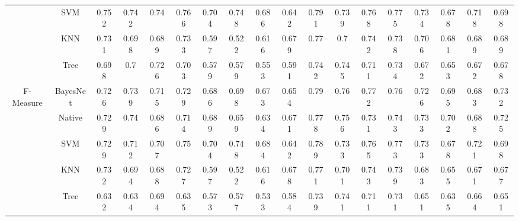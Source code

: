 {\begin{table*}[ht]
\begin{tabular}{|c|c|c|c|c|c|c|c|c|c|c|c|c|c|c|c|c|c|}
&SVM&	0.752&	0.742&	0.74&	0.766&		0.704&	0.748&	0.686&	0.642&		0.791&	0.739&	0.768&	0.775&		0.734&	0.678&	0.718&	0.698\\
&KNN&	0.731&	0.698&	0.689&	0.733&		0.597&	0.522&	0.616&	0.679&		0.77&	0.7	&0.742&	0.738&		0.706&	0.681&	0.689&	0.689\\
&Tree&	0.698&	0.7	&0.726&	0.703&		0.579&	0.579&	0.553&	0.591&		0.742&	0.745&	0.711&	0.734&		0.672&	0.653&	0.672&	0.678\\
\hline
\multirow{5}{*}{F-Measure}
&BayesNet&	0.726&	0.739&	0.715&	0.729&		0.686&	0.698&	0.673&	0.654&		0.79&	0.76&	0.772&	0.76&		0.726&	0.695&	0.683&	0.732\\
&Native&	0.729&	0.74&	0.686&	0.714&		0.689&	0.659&	0.634&	0.671&		0.778&	0.756&	0.731&	0.743&		0.733&	0.702&	0.688&	0.725\\
&SVM&	0.729&	0.712&	0.707&	0.75&	0.704&	0.748&	0.684&	0.642&		0.789&	0.733	&0.765&	0.773&		0.733&	0.678&	0.721&	0.698\\
&KNN&	0.732&	0.694&	0.688&	0.727&		0.597&	0.522&	0.616&	0.678&		0.771&	0.701&	0.743&	0.739&		0.683&	0.655&	0.671&	0.677\\
&Tree&	0.632&	0.634&	0.694&	0.635&		0.573&	0.577&	0.533&	0.584&		0.739&	0.741&	0.711&	0.731&		0.651&	0.635&	0.664&	0.651\\
\hline
\end{tabular}
\end{table*}

}
